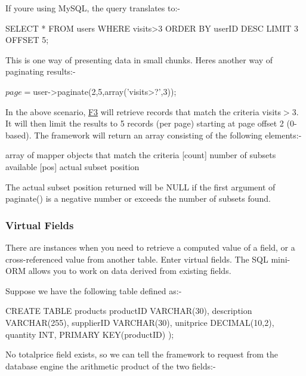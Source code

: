 If you\textquotesingle{}re using My\+S\+QL, the query translates to\+:-\/


\begin{DoxyCode}
SELECT * FROM users
WHERE visits>3
ORDER BY userID DESC
LIMIT 3 OFFSET 5;
\end{DoxyCode}


This is one way of presenting data in small chunks. Here\textquotesingle{}s another way of paginating results\+:-\/


\begin{DoxyCode}
$page=$user->paginate(2,5,array('visits>?',3));
\end{DoxyCode}


In the above scenario, \hyperlink{class_f3}{F3} will retrieve records that match the criteria {\ttfamily \textquotesingle{}visits$>$3\textquotesingle{}}. It will then limit the results to 5 records (per page) starting at page offset 2 (0-\/based). The framework will return an array consisting of the following elements\+:-\/


\begin{DoxyCode}
[subset] array of mapper objects that match the criteria
[count] number of subsets available
[pos] actual subset position
\end{DoxyCode}


The actual subset position returned will be N\+U\+LL if the first argument of {\ttfamily paginate()} is a negative number or exceeds the number of subsets found.

\subsubsection*{Virtual Fields}

There are instances when you need to retrieve a computed value of a field, or a cross-\/referenced value from another table. Enter virtual fields. The S\+QL mini-\/\+O\+RM allows you to work on data derived from existing fields.

Suppose we have the following table defined as\+:-\/


\begin{DoxyCode}
CREATE TABLE products
    productID VARCHAR(30),
    description VARCHAR(255),
    supplierID VARCHAR(30),
    unitprice DECIMAL(10,2),
    quantity INT,
    PRIMARY KEY(productID)
);
\end{DoxyCode}


No {\ttfamily totalprice} field exists, so we can tell the framework to request from the database engine the arithmetic product of the two fields\+:-\/


